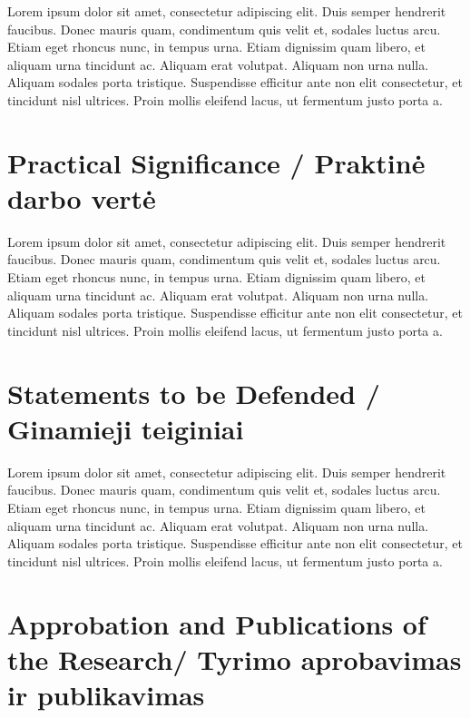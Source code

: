 Lorem ipsum dolor sit amet, consectetur adipiscing elit. Duis semper hendrerit faucibus. Donec mauris quam, condimentum quis velit et, sodales luctus arcu. Etiam eget rhoncus nunc, in tempus urna. Etiam dignissim quam libero, et aliquam urna tincidunt ac. Aliquam erat volutpat. Aliquam non urna nulla. Aliquam sodales porta tristique. Suspendisse efficitur ante non elit consectetur, et tincidunt nisl ultrices. Proin mollis eleifend lacus, ut fermentum justo porta a.



\section*{Practical Significance / Praktinė darbo vertė}  %

Lorem ipsum dolor sit amet, consectetur adipiscing elit. Duis semper hendrerit faucibus. Donec mauris quam, condimentum quis velit et, sodales luctus arcu. Etiam eget rhoncus nunc, in tempus urna. Etiam dignissim quam libero, et aliquam urna tincidunt ac. Aliquam erat volutpat. Aliquam non urna nulla. Aliquam sodales porta tristique. Suspendisse efficitur ante non elit consectetur, et tincidunt nisl ultrices. Proin mollis eleifend lacus, ut fermentum justo porta a.


\section*{Statements to be Defended / Ginamieji teiginiai}

Lorem ipsum dolor sit amet, consectetur adipiscing elit. Duis semper hendrerit faucibus. Donec mauris quam, condimentum quis velit et, sodales luctus arcu. Etiam eget rhoncus nunc, in tempus urna. Etiam dignissim quam libero, et aliquam urna tincidunt ac. Aliquam erat volutpat. Aliquam non urna nulla. Aliquam sodales porta tristique. Suspendisse efficitur ante non elit consectetur, et tincidunt nisl ultrices. Proin mollis eleifend lacus, ut fermentum justo porta a.


\section*{Approbation and Publications of the Research/ Tyrimo aprobavimas ir publikavimas} %

